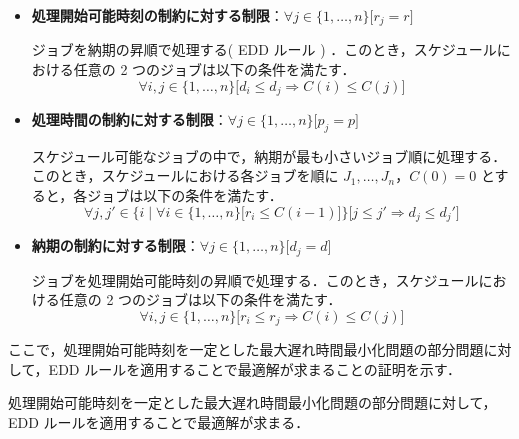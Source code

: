 \documentclass[12pt]{optlab-bachelor}
\begin{document}
\begin{itemize}
  \item \textbf{処理開始可能時刻の制約に対する制限}：$\forall j \in \{1,\ldots,n\}\big[ r_j = r \big]$

  ジョブを納期の昇順で処理する( EDD ルール ) ．このとき，スケジュールにおける任意の 2 つのジョブは以下の条件を満たす．
  \begin{displaymath}
    \forall i, j \in \{1,\ldots,n\}\big[d_i \le d_j \Rightarrow C(i) \le C(j)\big]
  \end{displaymath}
  \item \textbf{処理時間の制約に対する制限}：$\forall j \in \{1,\ldots,n\}\big[ p_j = p \big]$

  スケジュール可能なジョブの中で，納期が最も小さいジョブ順に処理する．このとき，スケジュールにおける各ジョブを順に $J_1,\ldots,J_n$，$C(0) = 0$ とすると，各ジョブは以下の条件を満たす．
  \begin{displaymath}
    \forall j, j' \in \bigg\{i \mid \forall i \in \{1,\ldots,n\}\big[r_i \le C(i - 1)\big]\bigg\}\bigg[j \le j' \Rightarrow d_j \le d_j'\bigg]
  \end{displaymath}
  \item \textbf{納期の制約に対する制限}：$\forall j \in \{1,\ldots,n\}\big[ d_j = d \big]$

  ジョブを処理開始可能時刻の昇順で処理する．このとき，スケジュールにおける任意の 2 つのジョブは以下の条件を満たす．
  \begin{displaymath}
    \forall i, j \in \{1,\ldots,n\}\big[r_i \le r_j \Rightarrow C(i) \le C(j)\big]
  \end{displaymath}
\end{itemize}

ここで，処理開始可能時刻を一定とした最大遅れ時間最小化問題の部分問題に対して，EDD ルールを適用することで最適解が求まることの証明を示す．

\begin{lemma}\label{l_5}
  処理開始可能時刻を一定とした最大遅れ時間最小化問題の部分問題に対して，EDD ルールを適用することで最適解が求まる．
\end{lemma}
\end{document}
